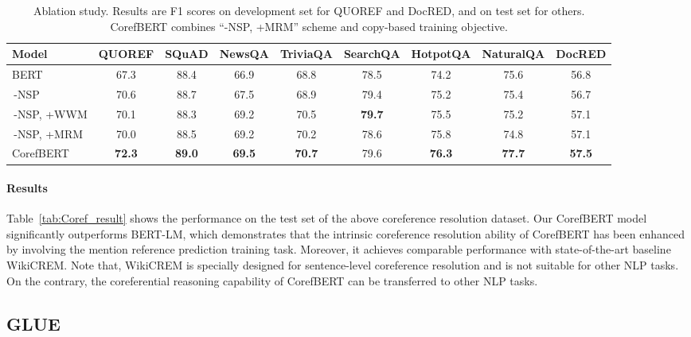 \documentclass[11pt,a4paper]{article}
\newcommand\BASESIZE{\xspace}
\begin{document}
\begin{table*}[!t]
\small
\centering
\begin{tabular}{lcccccccc}
\toprule

Model &  {QUOREF} & {SQuAD}& {NewsQA}  & {TriviaQA} & {SearchQA} &{HotpotQA} &{NaturalQA}  & {DocRED} \\
\midrule
BERT\BASESIZE & 67.3 & 88.4& 66.9 &68.8  & 78.5  & 74.2  & 75.6 & 56.8 \\
\,-NSP  &70.6  & 88.7 & 67.5 & 68.9 & 79.4  & 75.2 & 75.4 & 56.7 \\
\,-NSP, +WWM  & 70.1 &88.3 & 69.2 & 70.5&  \bf{79.7}& 75.5 & 75.2 & 57.1 \\
\,-NSP, +MRM  & 70.0 & 88.5 & 69.2&  70.2& 78.6 &75.8 & 74.8 & 57.1\\
CorefBERT\BASESIZE  & \bf{72.3} &  \bf{89.0} & \bf{69.5} & \bf{70.7} & 79.6 & \bf{76.3} & \bf{77.7} & \bf{57.5}\\ 



\bottomrule
\end{tabular}
\caption{Ablation study. Results are F1 scores on development set for QUOREF and DocRED, and on test set for others. CorefBERT\BASESIZE combines ``-NSP, +MRM'' scheme and copy-based training objective. } 
\label{tab:Abalation_result}
\end{table*}

\vspace{-0.1em}
\paragraph{Results}
Table~\ref{tab:Coref_result} shows the performance on the test set of the above coreference resolution dataset. Our CorefBERT model significantly outperforms BERT-LM, which demonstrates that the intrinsic coreference resolution ability of  CorefBERT has been enhanced by involving the mention reference prediction training task. Moreover, it achieves comparable performance with state-of-the-art baseline WikiCREM. Note that, WikiCREM is specially designed for sentence-level coreference resolution and is not suitable for other NLP tasks. On the contrary, the coreferential reasoning capability of CorefBERT can be transferred to other NLP tasks. 



\subsection{GLUE}
\end{document}
